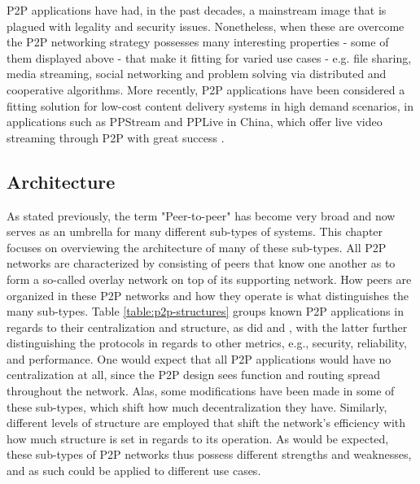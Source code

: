\documentclass[
  oneside,
  11pt, a4paper,
  footinclude=true,
  headinclude=true,
  cleardoublepage=empty
]{scrbook}
\begin{document}
	P2P applications have had, in the past decades, a mainstream image that is plagued with legality and security issues. Nonetheless, when these are overcome the P2P networking strategy possesses many interesting properties - some of them displayed above - that make it fitting for varied use cases - e.g. file sharing, media streaming, social networking and problem solving via distributed and cooperative algorithms. More recently, P2P applications have been considered a fitting solution for low-cost content delivery systems in high demand scenarios, in applications such as PPStream and PPLive in China, which offer live video streaming through P2P with great success \cite{cisco}.
	
	\subsection{Architecture}
    As stated previously, the term "Peer-to-peer" has become very broad and now serves as an umbrella for many different sub-types of systems. This chapter focuses on overviewing the architecture of many of these sub-types. All P2P networks are characterized by consisting of peers that know one another as to form a so-called overlay network on top of its supporting network. How peers are organized in these P2P networks and how they operate is what distinguishes the many sub-types. Table \ref{table:p2p-structures} groups known P2P applications in regards to their centralization and structure, as did \cite{p2p-survey-1} and \cite{p2p-survey-2}, with the latter further distinguishing the protocols in regards to other metrics, e.g., security, reliability, and performance. One would expect that all P2P applications would have no centralization at all, since the P2P design sees function and routing spread throughout the network. Alas, some modifications have been made in some of these sub-types, which shift how much decentralization they have. Similarly, different levels of structure are employed that shift the network's efficiency with how much structure is set in regards to its operation. As would be expected, these sub-types of P2P networks thus possess different strengths and weaknesses, and as such could be applied to different use cases.
    
\end{document}

